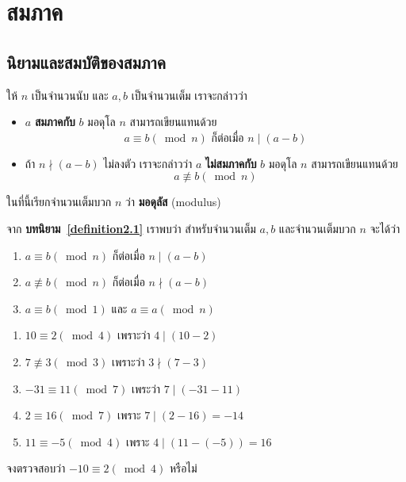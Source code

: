 \chapter{สมภาค}
\section{นิยามและสมบัติของสมภาค}
\begin{definitionbox}\label{definition2.1}
	ให้ $n$ เป็นจำนวนนับ และ $a,b$ เป็นจำนวนเต็ม เราจะกล่าวว่า 
	\begin{itemize}
		\item $a$ \textbf{สมภาคกับ} $b$ มอดุโล $n$ สามารถเขียนแทนด้วย 
		\[\text{$a \equiv b(\bmod n)$ ก็ต่อเมื่อ $n\mid (a-b)$}\]
		\item ถ้า $n\nmid (a-b)$ ไม่ลงตัว เราจะกล่าวว่า $a$ \textbf{ไม่สมภาคกับ} $b$ มอดุโล $n$ สามารถเขียนแทนด้วย 
		\[a \not \equiv b(\bmod n)\]
	\end{itemize}
	ในที่นี้เรียกจำนวนเต็มบวก $n$ ว่า \textbf{มอดุลัส} (modulus)    
\end{definitionbox}

\begin{remarkbox}
	จาก \textbf{บทนิยาม~\ref{definition2.1}} เราพบว่า สำหรับจำนวนเต็ม $a, b$ และจำนวนเต็มบวก $n$ จะได้ว่า
	\begin{enumerate}
		\item $a \equiv b(\bmod n)$ ก็ต่อเมื่อ $n \mid (a-b)$
		\item  $a \not \equiv b(\bmod n)$ ก็ต่อเมื่อ $n \nmid(a-b)$
		\item  $a \equiv b(\bmod 1)$ และ $a \equiv a(\bmod n)$
	\end{enumerate}   
\end{remarkbox}

\begin{examplebox}
	\begin{enumerate}
		\item  $10 \equiv 2(\bmod 4)$ เพราะว่า $4 \mid(10-2)$
		\item $7 \not \equiv 3(\bmod 3)$ เพราะว่า $3 \nmid(7-3)$
		\item $-31 \equiv 11(\bmod 7)$ เพระว่า $7 \mid(-31-11)$
		\item $2 \equiv 16(\bmod 7)$ เพราะ $7 \mid(2-16)=-14$
		\item $11 \equiv-5(\bmod 4)$ เพราะ $4 \mid(11-(-5))=16$
	\end{enumerate}    
\end{examplebox}

\begin{examplebox}
	จงตรวจสอบว่า $-10 \equiv 2(\bmod 4)$ หรือไม่
\end{examplebox}
\solution

